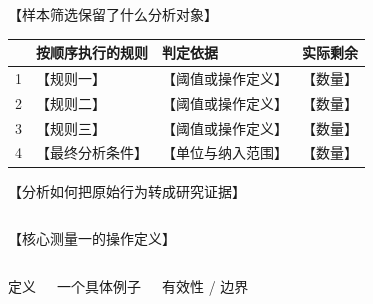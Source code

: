 \documentclass[aspectratio=169,11pt,fontset=fandol]{ctexbeamer}
\begin{document}
\begin{frame}{【样本筛选保留了什么分析对象】}
  \vspace{0pt}
  {\small
  \begin{tabular}{@{}r p{4.0cm} p{5.0cm} r@{}}
    \toprule
    & 按顺序执行的规则 & 判定依据 & 实际剩余 \\
    \midrule
    1 & 【规则一】 & 【阈值或操作定义】 & 【数量】 \\
    2 & 【规则二】 & 【阈值或操作定义】 & 【数量】 \\
    3 & 【规则三】 & 【阈值或操作定义】 & 【数量】 \\
    4 & 【最终分析条件】 & 【单位与纳入范围】 & 【数量】 \\
    \bottomrule
  \end{tabular}}
\end{frame}

\begin{frame}{【分析如何把原始行为转成研究证据】}
  \vspace{1.2em}
  \begin{columns}[c,onlytextwidth]
      \centering{}
    \centering{\color{Accent}\Large $\rightarrow$}
      \centering{}
    \centering{\color{Accent}\Large $\rightarrow$}
      \centering{}
  \end{columns}
\end{frame}

\begin{frame}{【核心测量一的操作定义】}
  \vspace{.8em}
  \begin{columns}[T,onlytextwidth]
      {\color{Accent}定义}\par
      \par
      \vspace{.7em}
      {\color{Accent}一个具体例子}\par
      \par
      \vspace{.7em}
      {\color{Accent}有效性 / 边界}\par
  \end{columns}
\end{frame}
\end{document}

